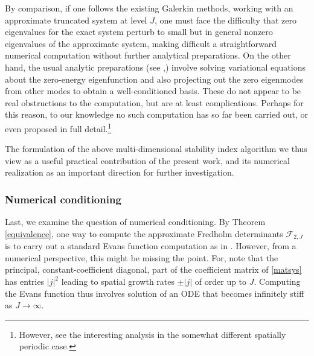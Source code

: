 By comparison, if one follows the existing Galerkin methods, working
with an approximate truncated system at level $J$, one must face
the difficulty that zero eigenvalues for the exact system perturb
to small but in general nonzero eigenvalues of the approximate system,
making difficult a straightforward numerical computation without
further analytical preparations.
On the other hand, the usual analytic preparations (see
\cite{AGJ90},\cite{PW92}) involve solving variational equations
about the zero-energy eigenfunction and also projecting out the zero
eigenmodes from other modes to obtain a well-conditioned basis.
These do not appear to be real obstructions to the computation, but
are at least complications.  Perhaps for this reason, to our knowledge
no such computation has so far been carried out, or even proposed
in full detail.\footnote{However, see the interesting analysis
\cite{OS07} in the somewhat different spatially periodic case.}

The formulation of the above multi-dimensional stability index
algorithm we thus view as a useful practical contribution of 
the present work, and its numerical realization as an important
direction for further investigation.

\subsubsection{Numerical conditioning}\label{conditioning}
Last, we examine the question of numerical conditioning.
By Theorem \ref{equivalence}, one way to compute the approximate
Fredholm determinants ${{\mathcal F}}_{2,J}$ is to carry out a standard
Evans function computation as in \cite{LPSS00}.
However, from a numerical perspective, this
might be missing the point.
For, note that the principal, constant-coefficient diagonal,
part of the coefficient matrix of \eqref{matsys} has entries
$|j|^2$ leading to spatial growth rates $\pm |j|$ of
order up to $J$. Computing the Evans function 
thus involves solution of an ODE that becomes
infinitely stiff as $J\to \infty$.

